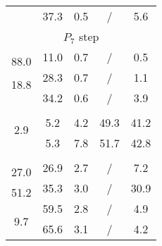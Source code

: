 \documentclass[11pt]{article}
\begin{document}
\begin{table}
\begin{tabular}{|ccccc|}
 & \multirow{2}{*}{37.3} & \multirow{2}{*}{0.5} & \multirow{2}{*}{/} & \multirow{2}{*}{5.6} \\ %
 & & & & \\ \hline \hline
\multicolumn{5}{|c|}{\multirow{2}{*}{$P_7$ step}} \\
\multicolumn{5}{|c|}{} \\ \hline
 & \multirow{2}{*}{11.0} & \multirow{2}{*}{0.7} & \multirow{2}{*}{/} & \multirow{2}{*}{0.5} \\ %
\multirow{2}{*}{88.0} & & & & \\ \cline{2-5} 
 & \multirow{2}{*}{28.3} & \multirow{2}{*}{0.7} & \multirow{2}{*}{/} & \multirow{2}{*}{1.1} \\ %
\multirow{2}{*}{18.8} & & & & \\ \cline{2-5} 
 & \multirow{2}{*}{34.2} & \multirow{2}{*}{0.6} & \multirow{2}{*}{/} & \multirow{2}{*}{3.9} \\ %
 & & & & \\ \hline \hline
\multicolumn{5}{|c|}{\multirow{2}{*}{\citet{Adhikari2002}}} \\
\multicolumn{5}{|c|}{} \\ \hline
 & \multirow{2}{*}{5.2} & \multirow{2}{*}{4.2} & \multirow{2}{*}{49.3} & \multirow{2}{*}{41.2} \\ %
\multirow{2}{*}{2.9} & & & & \\ \cline{2-5} 
 & \multirow{2}{*}{5.3} & \multirow{2}{*}{7.8} & \multirow{2}{*}{51.7} & \multirow{2}{*}{42.8} \\ %
 & & & & \\ \hline \hline
\multicolumn{5}{|c|}{\multirow{2}{*}{\citet{erlicher_modal_2007}}} \\
\multicolumn{5}{|c|}{} \\ \hline
 & \multirow{2}{*}{26.9} & \multirow{2}{*}{2.7} & \multirow{2}{*}{/} & \multirow{2}{*}{7.2} \\ %
\multirow{2}{*}{27.0} & & & & \\ \cline{2-5} 
 & \multirow{2}{*}{35.3} & \multirow{2}{*}{3.0} & \multirow{2}{*}{/} & \multirow{2}{*}{30.9} \\ %
\multirow{2}{*}{51.2} & & & & \\ \cline{2-5} 
 & \multirow{2}{*}{59.5} & \multirow{2}{*}{2.8} & \multirow{2}{*}{/} & \multirow{2}{*}{4.9} \\ %
\multirow{2}{*}{9.7} & & & & \\ \cline{2-5} 
 & \multirow{2}{*}{65.6} & \multirow{2}{*}{3.1} & \multirow{2}{*}{/} & \multirow{2}{*}{4.2} \\ %

\end{tabular}
\end{table}
\end{document}
